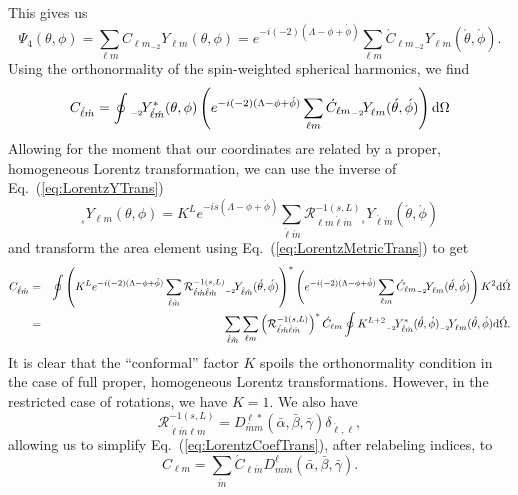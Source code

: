 \documentclass[11pt]{article}
\newcommand{\swY}[4][]{{}_{{}_{#2}}\!Y^{#1}_{#3}(#4)}
\begin{document}
This gives us
\begin{equation}
\Psi_4(\theta,\phi)=\sum_{\ell m}C_{\ell m}\swY{-2}{\ell m}{\theta,\phi}
=e^{-i(-2)(\Lambda-\phi+\acute\phi)}
\sum_{\ell m}\acute{C}_{\ell m}\swY{-2}{\ell m}{\acute\theta,\acute\phi}.
\end{equation}
Using the orthonormality of the spin-weighted spherical harmonics,
we find
\begin{equation}
C_{\acute\ell\acute{m}}=\oint{\swY[*]{-2}{\acute\ell\acute{m}}{\theta,\phi}
  \left(e^{-i(-2)(\Lambda-\phi+\acute\phi)}
  \sum_{\ell m}\acute{C}_{\ell m}\swY{-2}{\ell m}{\acute\theta,\acute\phi}\right)
  {\rm d}\Omega}
\end{equation}
Allowing for the moment that our coordinates are related by a proper,
homogeneous Lorentz transformation, we can use the inverse of
Eq.~(\ref{eq:LorentzYTrans})
\begin{equation}
\swY{s}{\ell m}{\theta,\phi}=
     K^Le^{-is(\Lambda-\phi+\acute\phi)}\sum_{\acute\ell\acute{m}}
         \mathcal{R}^{-1(s,L)}_{\ell m\acute\ell\acute{m}}
                 \swY{s}{\acute\ell\acute{m}}{\acute\theta,\acute\phi} 
\end{equation}
and transform the area element using Eq.~(\ref{eq:LorentzMetricTrans}) to
get
\begin{eqnarray}
C_{\acute\ell\acute{m}}&=&\oint{
  \left(K^Le^{-i(-2)(\Lambda-\phi+\acute\phi)}\sum_{\hat\ell\hat{m}}
         \mathcal{R}^{-1(s,L)}_{\acute\ell\acute{m}\hat\ell\hat{m}}
                 \swY{-2}{\hat\ell\hat{m}}{\acute\theta,\acute\phi}
\right)^*
  \left(e^{-i(-2)(\Lambda-\phi+\acute\phi)}
  \sum_{\ell m}\acute{C}_{\ell m}\swY{-2}{\ell m}{\acute\theta,\acute\phi}\right)
  K^2{\rm d}\acute\Omega} \\ \mbox{} \label{eq:LorentzCoefTrans}
&=& \sum_{\hat\ell\hat{m}}{\sum_{\ell m}{
 \left(\mathcal{R}^{-1(s,L)}_{\acute\ell\acute{m}\hat\ell\hat{m}}\right)^*
 \acute{C}_{\ell m}
 \oint{K^{L+2}\swY[*]{-2}{\hat\ell\hat{m}}{\acute\theta,\acute\phi}
   \swY{-2}{\ell m}{\acute\theta,\acute\phi}{\rm d}\acute\Omega}}}.
\end{eqnarray}
It is clear that the ``conformal'' factor $K$ spoils the
orthonormality condition in the case of full proper, homogeneous
Lorentz transformations.  However, in the restricted case of
rotations, we have $K=1$.  We also have 
\begin{equation}
  \mathcal{R}^{-1(s,L)}_{\acute\ell\acute{m}\ell m} = 
  D^{\ell*}_{\acute{m}m}(\bar\alpha,\bar\beta,\bar\gamma)\delta_{\acute\ell,\ell},
\end{equation}
allowing us to simplify Eq.~(\ref{eq:LorentzCoefTrans}), after
relabeling indices, to
\begin{equation}
  C_{\ell{m}} = \sum_{\acute{m}}{
    \acute{C}_{\ell\acute{m}}
    D^\ell_{m\acute{m}}(\bar\alpha,\bar\beta,\bar\gamma)}.
\end{equation}
\end{document}
